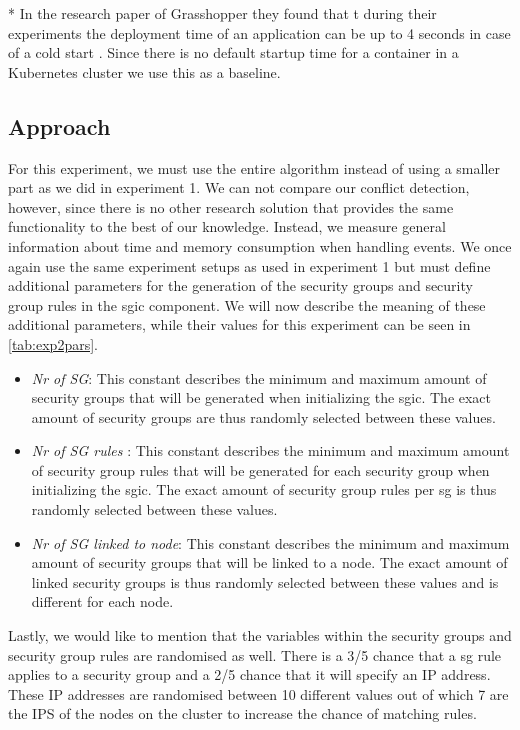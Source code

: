 * In the research paper of Grasshopper they found that t during their experiments the deployment time of an application can be up to 4 seconds in case of a cold start \cite{grashopper}. Since there is no default startup time for a container in a Kubernetes cluster we use this as a baseline.

\subsection{Approach} \label{exp2:approach}
For this experiment, we must use the entire algorithm instead of using a smaller part as we did in experiment 1. We can not compare our conflict detection, however, since there is no other research solution that provides the same functionality to the best of our knowledge. Instead, we measure general information about time and memory consumption when handling events. We once again use the same experiment setups as used in experiment 1 but must define additional parameters for the generation of the security groups and security group rules in the \acrshort{sgic} component. We will now describe the meaning of these additional parameters, while their values for this experiment can be seen in \autoref{tab:exp2pars}.

\begin{itemize}
    \item \textit{Nr of SG}: This constant describes the minimum and maximum amount of security groups that will be generated when initializing the \acrshort{sgic}. The exact amount of security groups are thus randomly selected between these values.
    \item \textit{Nr of SG rules }: This constant describes the minimum and maximum amount of security group rules that will be generated for each security group when initializing the \acrshort{sgic}. The exact amount of security group rules per \acrshort{sg} is thus randomly selected between these values.
    \item \textit{Nr of SG linked to node}: This constant describes the minimum and maximum amount of security groups that will be linked to a node. The exact amount of linked security groups is thus randomly selected between these values and is different for each node.
\end{itemize}

Lastly, we would like to mention that the variables within the security groups and security group rules are randomised as well. There is a 3\slash 5 chance that a \acrshort{sg} rule applies to a security group and a 2\slash 5 chance that it will specify an IP address. These IP addresses are randomised between 10 different values out of which 7 are the IPS of the nodes on the cluster to increase the chance of matching rules. 


